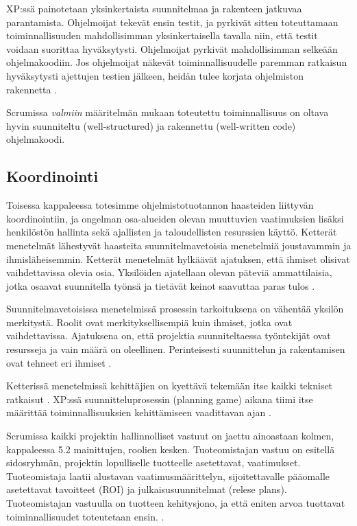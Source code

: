 \documentclass[finnish]{tktltiki2}
\theoremstyle{definition}
\theoremstyle{remark}
\begin{document}
XP:ssä painotetaan yksinkertaista suunnitelmaa ja rakenteen jatkuvaa parantamista. Ohjelmoijat tekevät ensin testit, ja pyrkivät sitten toteuttamaan toiminnallisuuden mahdollisimman yksinkertaisella tavalla niin, että testit voidaan suorittaa hyväksytysti. Ohjelmoijat pyrkivät mahdollisimman selkeään ohjelmakoodiin. Jos ohjelmoijat näkevät  toiminnallisuudelle paremman ratkaisun hyväksytysti ajettujen testien jälkeen, heidän tulee korjata ohjelmiston rakennetta \cite{BEC99}.

Scrumissa \textit{valmiin} määritelmän mukaan toteutettu toiminnallisuus on oltava hyvin suunniteltu (well-structured) ja rakennettu (well-written code) ohjelmakoodi\cite{SCH09}.

\subsection{Koordinointi}

Toisessa kappaleessa totesimme ohjelmistotuotannon haasteiden liittyvän koordinointiin, ja ongelman osa-alueiden olevan muuttuvien vaatimuksien lisäksi henkilöstön hallinta sekä ajallisten ja taloudellisten resurssien käyttö. Ketterät menetelmät lähestyvät haasteita suunnitelmavetoisia menetelmiä joustavammin ja ihmisläheisemmin. Ketterät menetelmät hylkäävät ajatuksen, että ihmiset olisivat vaihdettavissa olevia osia. Yksilöiden ajatellaan olevan päteviä ammattilaisia, jotka osaavat suunnitella työnsä ja tietävät keinot saavuttaa paras tulos \cite{FOW01a}.

Suunnitelmavetoisissa menetelmissä prosessin tarkoituksena on vähentää yksilön merkitystä. Roolit ovat merkityksellisempiä kuin ihmiset, jotka ovat vaihdettavissa. Ajatuksena on, että projektia suunniteltaessa työntekijät ovat resursseja ja vain määrä on oleellinen. Perinteisesti suunnittelun ja rakentamisen ovat tehneet eri ihmiset \cite{FOW01a}.

Ketterissä menetelmissä kehittäjien on kyettävä tekemään itse kaikki tekniset ratkaisut \cite{FOW01a}.  XP:ssä suunnitteluprosessin (planning game) aikana tiimi itse määrittää toiminnallisuuksien kehittämiseen vaadittavan ajan \cite{BEC99}.

Scrumissa kaikki projektin hallinnolliset vastuut on jaettu ainoastaan kolmen, kappaleessa 5.2 mainittujen, roolien kesken. Tuoteomistajan vastuu on esitellä sidosryhmän, projektin lopulliselle tuotteelle asetettavat, vaatimukset. Tuoteomistaja laatii alustavan vaatimusmäärittelyn, sijoitettavalle pääomalle asetettavat tavoitteet (ROI) ja julkaisusuunnitelmat (relese plans). Tuoteomistajan vastuulla on tuotteen kehitysjono, ja että eniten arvoa tuottavat toiminnallisuudet toteutetaan ensin. \cite{SCH09}.
\end{document}
